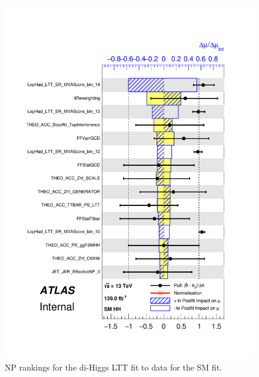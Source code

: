    \begin{figure}
   \centering
   \includegraphics[width=.8\textwidth]{figures/results/HH/LepHad/pulls_SigXsecOverSM_125_LTT.pdf}
   \caption{NP rankings for the di-Higgs \lephad LTT fit to data for the SM fit.}
   \label{fig:LepHadPostfitNPRankingsSMLTT}
   \end{figure}
   
